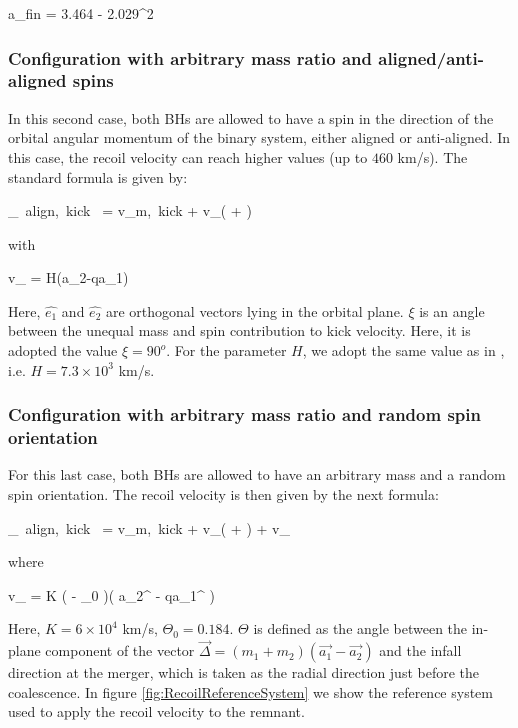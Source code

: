 \documentclass[a4,useAMS,usenatbib,usegraphicx,12pt]{article}
\begin{document}
{ a_{\mbox{\tiny{fin}}} = 3.464 \eta - 2.029\eta^2 }

\subsubsection{Configuration with arbitrary mass ratio and aligned/anti-aligned spins}

In this second case, both BHs are allowed to have a spin in the direction of the orbital angular 
momentum of the binary system, either aligned or anti-aligned. In this case, the recoil velocity 
can reach higher values (up to $460$ km/s). The standard formula is given by:

{ _{\mbox{\tiny{ align, kick }}} = v_{\mbox{\tiny{m, kick}}}  + 
v_{\bot}( \cos{\xi} + \sin{\xi} ) }

with 

{ v_{\bot} = H(a_2-qa_1) }

Here, $\hat{e_1}$ and $\hat{e_2}$ are orthogonal vectors lying in the orbital plane. $\xi$ is an 
angle between the unequal mass and spin contribution to kick velocity. Here, it is adopted the value
$\xi = 90^o$. For the parameter $H$, we adopt the same value as in \citet{Campanelli2007}, i.e. 
$H = 7.3 \times 10^3$ km/s.

\subsubsection{Configuration with arbitrary mass ratio and random spin orientation}

For this last case, both BHs are allowed to have an arbitrary mass and a random spin orientation. 
The recoil velocity is then given by the next formula:

{ _{\mbox{\tiny{ align, kick }}} = v_{\mbox{\tiny{m, kick}}}  + 
v_{\bot}( \cos{\xi} + \sin{\xi} ) + v_{\parallel} }

where

{ v_{\parallel} = K \cos( \Theta - \Theta_0 )( a_2^{\bot} - qa_1^{\bot} ) }

Here, $K = 6\times 10^4$ km/s, $\Theta_0 = 0.184$. $\Theta$ is defined as the angle between 
the in-plane component of the vector $\vec{\Delta} = (m_1+m_2)(\vec{a_1}-\vec{a_2})$ and the infall 
direction at the merger, which is taken as the radial direction just before the coalescence. In figure
\ref{fig:RecoilReferenceSystem} we show the reference system used to apply the recoil velocity to the
remnant.
\end{document}
